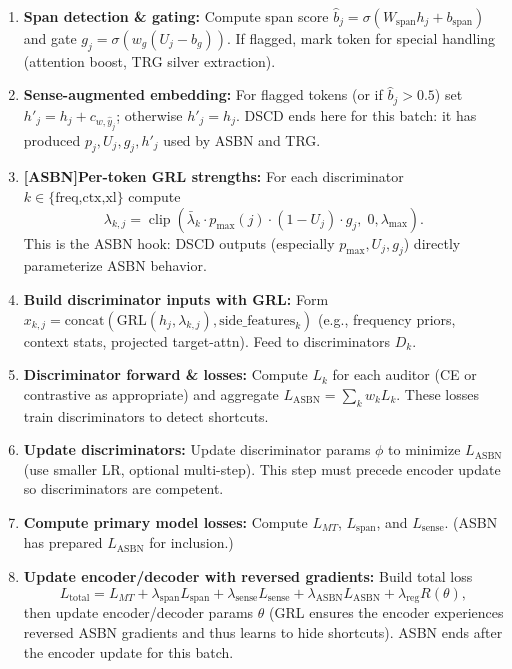 \documentclass[11pt]{article}
\begin{document}
\begin{enumerate}
  \item \textbf{Span detection \& gating:} Compute span score $\hat b_j=\sigma(W_{\text{span}}h_j+b_{\text{span}})$ and gate $g_j=\sigma(w_g(U_j-b_g))$. If flagged, mark token for special handling (attention boost, TRG silver extraction).
  
  \item \textbf{Sense-augmented embedding:} For flagged tokens (or if $\hat b_j>0.5$) set $h'_j=h_j+c_{w,\hat y_j}$; otherwise $h'_j=h_j$. DSCD ends here for this batch: it has produced $p_j,U_j,g_j,h'_j$ used by ASBN and TRG.
  
  \item \textbf{[ASBN]Per-token GRL strengths:} For each discriminator $k\in\{\text{freq,ctx,xl}\}$ compute
    \[
      \lambda_{k,j}=\operatorname{clip}(\bar\lambda_k\cdot p_{\max}(j)\cdot (1-U_j)\cdot g_j,\;0,\lambda_{\max}).
    \]
    This is the ASBN hook: DSCD outputs (especially $p_{\max},U_j,g_j$) directly parameterize ASBN behavior.
  
  \item \textbf{Build discriminator inputs with GRL:} Form $x_{k,j}=\mathrm{concat}(\mathrm{GRL}(h_j,\lambda_{k,j}),\text{side\_features}_k)$ (e.g., frequency priors, context stats, projected target-attn). Feed to discriminators $D_k$.
  
  \item \textbf{Discriminator forward \& losses:} Compute $L_k$ for each auditor (CE or contrastive as appropriate) and aggregate $L_{\text{ASBN}}=\sum_k w_k L_k$. These losses train discriminators to detect shortcuts.
  
  \item \textbf{Update discriminators:} Update discriminator params $\phi$ to minimize $L_{\text{ASBN}}$ (use smaller LR, optional multi-step). This step must precede encoder update so discriminators are competent.
  
  \item \textbf{Compute primary model losses:} Compute $L_{MT}$, $L_{\text{span}}$, and $L_{\text{sense}}$. (ASBN has prepared $L_{\text{ASBN}}$ for inclusion.)
  
  \item \textbf{Update encoder/decoder with reversed gradients:} Build total loss
    \[
      L_{\text{total}}=L_{MT}+\lambda_{\text{span}}L_{\text{span}}+\lambda_{\text{sense}}L_{\text{sense}}+\lambda_{\text{ASBN}}L_{\text{ASBN}}+\lambda_{\text{reg}}R(\theta),
    \]
    then update encoder/decoder params $\theta$ (GRL ensures the encoder experiences reversed ASBN gradients and thus learns to hide shortcuts). ASBN ends after the encoder update for this batch.
  

\end{enumerate}
\end{document}
